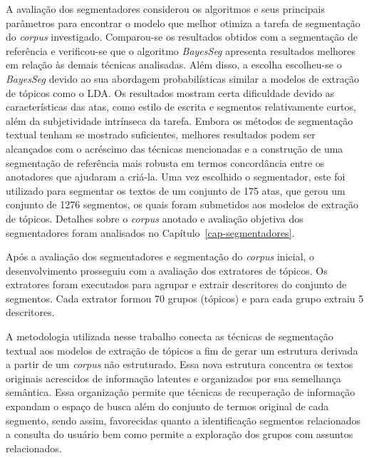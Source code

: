 A avaliação dos segmentadores considerou os algoritmos e seus principais parâmetros para encontrar o modelo que melhor otimiza a tarefa de segmentação do \textit{corpus} investigado. Comparou-se os resultados obtidos com a segmentação de referência e verificou-se que o algoritmo \textit{BayesSeg} apresenta resultados melhores em relação às demais técnicas analisadas. Além disso, a escolha escolheu-se o \textit{BayesSeg} devido ao sua abordagem probabilísticas similar a modelos de extração de tópicos como o LDA. 
Os resultados mostram certa dificuldade devido as características das atas, como estilo de escrita e segmentos relativamente curtos, além da subjetividade intrínseca da tarefa.
Embora os métodos de segmentação textual tenham se mostrado suficientes, melhores resultados podem ser alcançados com o acréscimo das técnicas mencionadas e a construção de uma segmentação de referência mais robusta em termos concordância entre os anotadores que ajudaram a criá-la.
Uma vez escolhido o segmentador, este foi utilizado para segmentar os textos de um conjunto de 175 atas, que gerou um conjunto de 1276 segmentos, os quais foram submetidos aos modelos de extração de tópicos.
Detalhes sobre o \textit{corpus} anotado e avaliação objetiva dos segmentadores foram analisados no Capítulo~\ref{cap-segmentadores}.




Após a avaliação dos segmentadores e segmentação do \textit{corpus} inicial, o desenvolvimento prosseguiu com a avaliação dos extratores de tópicos. Os extratores foram executados para agrupar e extrair descritores do conjunto de segmentos. Cada extrator formou 70 grupos (tópicos) e para cada grupo extraiu 5 descritores. 

A metodologia utilizada nesse trabalho conecta as técnicas de segmentação textual aos modelos de extração de tópicos a fim de gerar um estrutura derivada a partir de um \textit{corpus} não estruturado. Essa nova estrutura concentra os textos originais acrescidos de informação latentes e organizados por sua semelhança semântica. Essa organização permite que técnicas de recuperação de informação expandam o espaço de busca além do conjunto de termos original de cada segmento, sendo assim, favorecidas quanto a identificação segmentos relacionados a consulta do usuário bem como permite a exploração dos grupos com assuntos relacionados.





